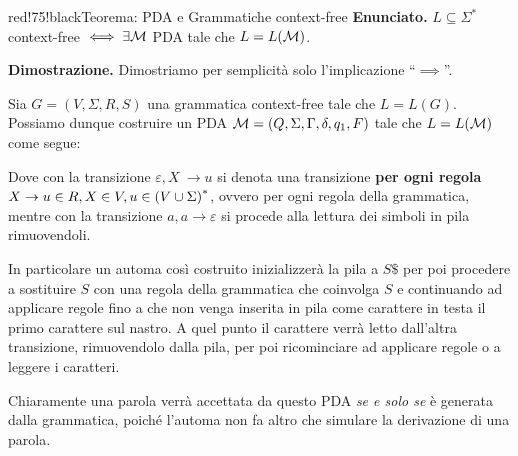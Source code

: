 \begin{halfframedbox}{red!75!black}{Teorema: PDA e Grammatiche context-free}\label{Teorema PDA CFG}
  \textbf{Enunciato.} $L \subseteq \Sigma^*$ context-free $ \iff \exists \mathcal{M} $ PDA tale che $ L = L(\mathcal{M}) $.

  \begin{center}
    \textcolor{red!75!black}{\hdashrule[0.5ex]{18cm}{1pt}{3mm 3pt 1mm 2pt}}
  \end{center}

  \textbf{Dimostrazione.} Dimostriamo per semplicità solo l'implicazione ``$\implies$''.

  Sia $G=(V,\Sigma,R,S)$ una grammatica context-free tale che $L = L(G)$. Possiamo dunque costruire un PDA $\mathcal{M} = (Q, \Sigma, \Gamma, \delta, q_1, F)$ tale che $L = L(\mathcal{M})$ come segue:

  \medskip

  \begin{center}
  \end{center}

  Dove con la transizione $\varepsilon, X\ \to u$ si denota una transizione \textbf{per ogni regola $X \to u \in R, X \in V, u \in \displaystyle{\left({V \cup \Sigma}\right)}^*$}, ovvero per ogni regola della grammatica, mentre con la transizione $a, a \to \varepsilon$ si procede alla lettura dei simboli in pila rimuovendoli.

  In particolare un automa così costruito inizializzerà la pila a $S\$$ per poi procedere a sostituire $S$ con una regola della grammatica che coinvolga $S$  e continuando ad applicare regole fino a che non venga inserita in pila come carattere in testa il primo carattere sul nastro. A quel punto il carattere verrà letto dall'altra transizione, rimuovendolo dalla pila, per poi ricominciare ad applicare regole o a leggere i caratteri.

  Chiaramente una parola verrà accettata da questo PDA \textit{se e solo se} è generata dalla grammatica, poiché l'automa non fa altro che simulare la derivazione di una parola.

\end{halfframedbox}

